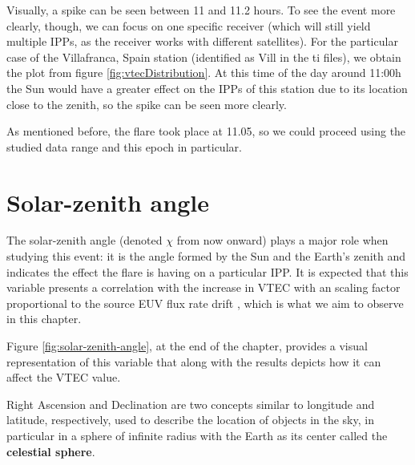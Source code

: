 Visually, a spike can be seen between 11 and 11.2 hours. To see the event more clearly, though, we can focus on one specific receiver (which will still yield multiple IPPs, as the receiver works with different satellites). For the particular case of the Villafranca, Spain station (identified as Vill in the ti files), we obtain the plot from figure \ref{fig:vtecDistribution}. At this time of the day around 11:00h the Sun would have a greater effect on the IPPs of this station due to its location close to the zenith, so the spike can be seen more clearly. 

As mentioned before, the flare took place at 11.05, so we could proceed using the studied data range and this epoch in particular.




\section{Solar-zenith angle}

The solar-zenith angle (denoted $\chi$ from now onward) plays a major role when studying this event: it is the angle formed by the Sun and the Earth's zenith and indicates the effect the flare is having on a particular IPP. It is expected that this variable presents a correlation with the increase in VTEC with an scaling factor proportional to the source EUV flux rate drift \cite{hernandez2012gnss}, which is what we aim to observe in this chapter.

Figure \ref{fig:solar-zenith-angle}, at the end of the chapter, provides a visual representation of this variable that along with the results depicts how it can affect the VTEC value. 

Right Ascension and Declination are two concepts similar to longitude and latitude, respectively, used to describe the location of objects in the sky, in particular in a sphere of infinite radius with the Earth as its center called the \textbf{celestial sphere}.

